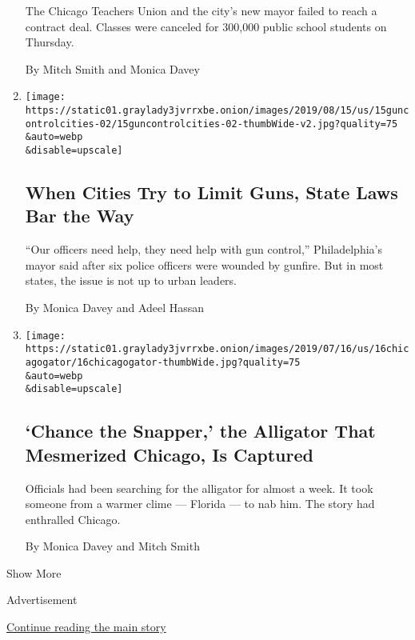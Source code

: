 \begin{enumerate}
  The Chicago Teachers Union and the city's new mayor failed to reach a
  contract deal. Classes were canceled for 300,000 public school
  students on Thursday.

  By Mitch Smith and Monica Davey
\item
  \href{/2019/08/15/us/philadelphia-shooting-gun-control.html}{}

  \texttt{[image: https://static01.graylady3jvrrxbe.onion/images/2019/08/15/us/15guncontrolcities-02/15guncontrolcities-02-thumbWide-v2.jpg?quality=75\\\&auto=webp\\\&disable=upscale]}

  \hypertarget{when-cities-try-to-limit-guns-state-laws-bar-the-way}{%
  \subsection{When Cities Try to Limit Guns, State Laws Bar the
  Way}\label{when-cities-try-to-limit-guns-state-laws-bar-the-way}}

  ``Our officers need help, they need help with gun control,''
  Philadelphia's mayor said after six police officers were wounded by
  gunfire. But in most states, the issue is not up to urban leaders.

  By Monica Davey and Adeel Hassan
\item
  \href{/2019/07/16/us/alligator-chicago-chance-snapper.html}{}

  \texttt{[image: https://static01.graylady3jvrrxbe.onion/images/2019/07/16/us/16chicagogator/16chicagogator-thumbWide.jpg?quality=75\\\&auto=webp\\\&disable=upscale]}

  \hypertarget{chance-the-snapper-the-alligator-that-mesmerized-chicago-is-captured}{%
  \subsection{`Chance the Snapper,' the Alligator That Mesmerized
  Chicago, Is
  Captured}\label{chance-the-snapper-the-alligator-that-mesmerized-chicago-is-captured}}

  Officials had been searching for the alligator for almost a week. It
  took someone from a warmer clime --- Florida --- to nab him. The story
  had enthralled Chicago.

  By Monica Davey and Mitch Smith
\end{enumerate}

Show More

Advertisement

\protect\hyperlink{after-mid2}{Continue reading the main story}

